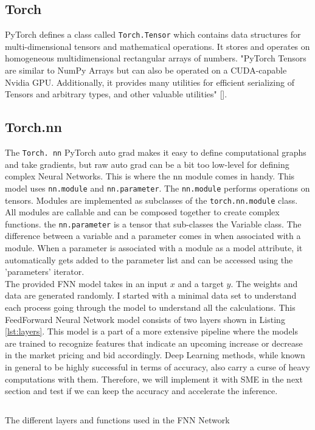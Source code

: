 \subsection{Torch}
PyTorch defines a class called \texttt{Torch.Tensor} which contains data structures for multi-dimensional tensors and mathematical operations. It stores and operates on homogeneous multidimensional rectangular arrays of numbers. "PyTorch Tensors are similar to NumPy Arrays but can also be operated on a CUDA-capable Nvidia GPU.
Additionally, it provides many utilities for efficient serializing of Tensors and arbitrary types, and other valuable utilities" [\cite{py}].



\subsection{Torch.nn}
The \texttt{Torch. nn} PyTorch auto grad makes it easy to define computational graphs and take gradients, but raw auto grad can be a bit too low-level for defining complex Neural Networks. This is where the nn module comes in handy. This model uses \texttt{nn.module} and \texttt{nn.parameter}. The \texttt{nn.module} performs operations on tensors. Modules are implemented as subclasses of the \texttt{torch.nn.module} class. All modules are callable and can be composed together to create complex functions.
the \texttt{nn.parameter} is a tensor that sub-classes the Variable class.
The difference between a variable and a parameter comes in when associated with a module. When a parameter is associated with a module as a model attribute, it automatically gets added to the parameter list and can be accessed using the 'parameters' iterator. \\

The provided FNN model takes in an input $x$ and a target $y$. The weights and data are generated randomly.
I started with a minimal data set to understand each process going through the model to understand all the calculations. This FeedForward Neural Network model consists of two layers shown in Listing \ref{lst:layers}. 
This model is a part of a more extensive pipeline where the models are trained to recognize features that indicate an upcoming increase or decrease in the market pricing and bid accordingly.
Deep Learning methods, while known in general to be highly successful in terms of accuracy, also carry a curse of heavy computations with them. Therefore, we will implement it with SME in the next section and test if we can keep the accuracy and accelerate the inference.

\begin{listing}
  \inputminted{python}{codesnippets/fnn.py}
  \caption{The different layers and functions used in the FNN Network}
  \label{lst:layers}
\end{listing}





